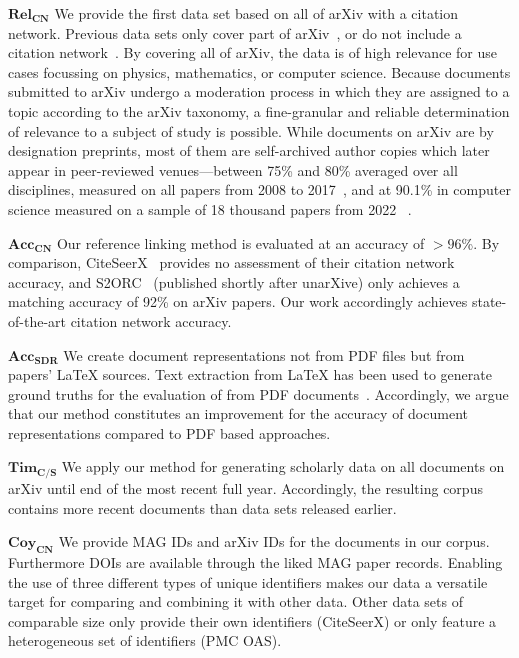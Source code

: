 $\mathbf{Rel_{CN}}$ We provide the first data set based on all of arXiv with a citation network. Previous data sets only cover part of arXiv~\cite{Faerber2018LREC}, or do not include a citation network~\cite{arXMLiv}. By covering all of arXiv, the data is of high relevance for use cases focussing on physics, mathematics, or computer science. %
Because documents submitted to arXiv undergo a moderation process in which they are assigned to a topic according to the arXiv taxonomy, a fine-granular and reliable determination of relevance to a subject of study is possible. While documents on arXiv are by designation preprints, most of them are self-archived author copies which later appear in peer-reviewed venues---between 75\% and 80\% averaged over all disciplines, measured on all papers from 2008 to 2017~\cite{Lin2020}, and at 90.1\% in computer science measured on a sample of 18 thousand papers from 2022~\cite{Bagchi2024} .

$\mathbf{Acc_{CN}}$ Our reference linking method is evaluated at an accuracy of $>96$\%. By comparison, CiteSeerX~\cite{Wu2015,Wu2016,Patel2021} provides no assessment of their citation network accuracy, and S2ORC~\cite{Lo2020} (published shortly after unarXive) only achieves a matching accuracy of 92\% on arXiv papers. Our work accordingly achieves state-of-the-art citation network accuracy.

$\mathbf{Acc_{SDR}}$ We create document representations not from PDF files but from papers' \LaTeX{} sources. Text extraction from \LaTeX{} has been used to generate ground truths for the evaluation of from PDF documents~\cite{Bast2017}. Accordingly, we argue that our method constitutes an improvement for the accuracy of document representations compared to PDF based approaches.

$\mathbf{Tim_{C/S}}$ We apply our method for generating scholarly data on all documents on arXiv until end of the most recent full year. Accordingly, the resulting corpus contains more recent documents than data sets released earlier.

$\mathbf{Coy_{CN}}$ We provide MAG IDs and arXiv IDs for the documents in our corpus. Furthermore DOIs are available through the liked MAG paper records. Enabling the use of three different types of unique identifiers makes our data a versatile target for comparing and combining it with other data. Other data sets of comparable size only provide their own identifiers (CiteSeerX) or only feature a heterogeneous set of identifiers (PMC OAS).


